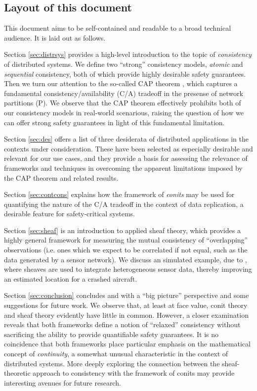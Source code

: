 \subsection{Layout of this document}

This document aims to be self-contained and readable to a broad
technical audience. It is laid out as follows.

Section \ref{sec:distrsys} provides a high-level introduction to the
topic of \emph{consistency} of distributed systems. We define two
``strong'' consistency models, \emph{atomic} and \emph{sequential}
consistency, both of which provide highly desirable safety
guarantees. Then we turn our attention to the so-called CAP theorem
\cite{2000brewerCAP} \cite{2002gilbertlynchCAP}, which captures a
fundamental consistency/availability (C/A) tradeoff in the presense of
network partitions (P). We observe that the CAP theorem effectively
prohibits both of our consistency models in real-world scenarious,
raising the question of how we can offer strong safety guarantees in
light of this fundamental limitation.

Section \ref{sec:des} offers a list of three desiderata of distributed
applications in the contexts under consideration. These have been
selected as especially desirable and relevant for our use cases, and
they provide a basis for assessing the relevance of frameworks and
techniques in overcoming the apparent limitations imposed by the CAP
theorem and related results.

Section \ref{sec:contcons} explains how the framework of \emph{conits}
\cite{2002tact} may be used for quantifying the nature of the C/A
tradeoff in the context of data replication, a desirable feature for
safety-critical systems.

Section \ref{sec:sheaf} is an introduction to
applied sheaf theory, which provides a highly general framework for
measuring the mutual consistency of ``overlapping'' observations
(i.e. ones which we expect to be correlated if not equal, such as the
data generated by a sensor network). We discuss an simulated example,
due to \cite{}, where sheaves are used to integrate heterogeneous
sensor data, thereby improving an estimated location for a crashed
aircraft.

Section \ref{sec:conclusion} concludes and with a ``big picture''
perspective and some suggestions for future work. We observe that, at
least at face value, conit theory and sheaf theory evidently have
little in common. However, a closer examination reveals that both
frameworks define a notion of ``relaxed'' consistency without
sacrificing the ability to provide quantifiable safety guarantees. It
is no coincidence that both frameworks place particular emphasis on
the mathematical concept of \emph{continuity}, a somewhat unusual
characteristic in the context of distributed systems. More deeply
exploring the connection between the sheaf-theoretic approach to
consistency with the framework of conits may provide interesting
avenues for future research.
